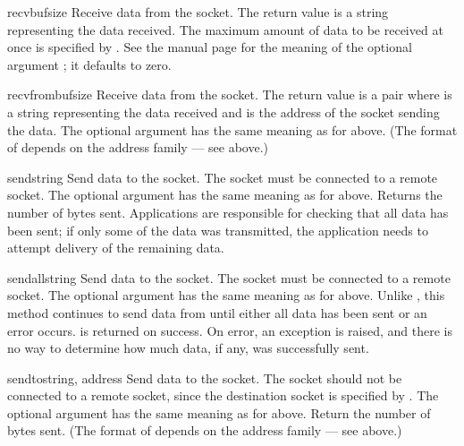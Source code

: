 \begin{methoddesc}[socket]{recv}{bufsize}
Receive data from the socket.  The return value is a string representing
the data received.  The maximum amount of data to be received
at once is specified by .  See the \UNIX{} manual page
 for the meaning of the optional argument
; it defaults to zero.
\end{methoddesc}

\begin{methoddesc}[socket]{recvfrom}{bufsize}
Receive data from the socket.  The return value is a pair
 where  is a string
representing the data received and  is the address of the
socket sending the data.  The optional  argument has the
same meaning as for  above.
(The format of  depends on the address family --- see above.)
\end{methoddesc}

\begin{methoddesc}[socket]{send}{string}
Send data to the socket.  The socket must be connected to a remote
socket.  The optional  argument has the same meaning as for
 above.  Returns the number of bytes sent.
Applications are responsible for checking that all data has been sent;
if only some of the data was transmitted, the application needs to
attempt delivery of the remaining data.
\end{methoddesc}

\begin{methoddesc}[socket]{sendall}{string}
Send data to the socket.  The socket must be connected to a remote
socket.  The optional  argument has the same meaning as for
 above.  Unlike , this method continues
to send data from  until either all data has been sent or
an error occurs.   is returned on success.  On error, an
exception is raised, and there is no way to determine how much data,
if any, was successfully sent.
\end{methoddesc}

\begin{methoddesc}[socket]{sendto}{string, address}
Send data to the socket.  The socket should not be connected to a
remote socket, since the destination socket is specified by
.  The optional  argument has the same
meaning as for  above.  Return the number of bytes sent.
(The format of  depends on the address family --- see above.)
\end{methoddesc}

